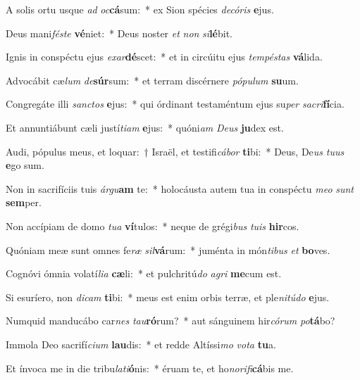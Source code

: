 \item A solis ortu usque \textit{ad} \textit{oc}\textbf{cá}sum:~* ex Sion spécies \textit{de}\textit{có}\textit{ris} \textbf{e}jus.
\item Deus mani\textit{fés}\textit{te} \textbf{vé}niet:~* Deus noster \textit{et} \textit{non} \textit{si}\textbf{lé}bit.
\item Ignis in conspéctu ejus \textit{ex}\textit{ar}\textbf{dé}scet:~* et in circúitu ejus \textit{tem}\textit{pés}\textit{tas} \textbf{vá}lida.
\item Advocábit cæ\textit{lum} \textit{de}\textbf{súr}sum:~* et terram discérnere \textit{pó}\textit{pu}\textit{lum} \textbf{su}um.
\item Congregáte illi \textit{sanc}\textit{tos} \textbf{e}jus:~* qui órdinant testaméntum ejus su\textit{per} \textit{sa}\textit{cri}\textbf{fí}cia.
\item Et annuntiábunt cæli justí\textit{ti}\textit{am} \textbf{e}jus:~* quóni\textit{am} \textit{De}\textit{us} \textbf{ju}dex est.
\item Audi, pópulus meus, et loquar:~† Israël, et testifi\textit{cá}\textit{bor} \textbf{ti}bi:~* Deus, De\textit{us} \textit{tu}\textit{us} \textbf{e}go sum.
\item Non in sacrifíciis tuis \textit{ár}\textit{gu}\textbf{am} te:~* holocáusta autem tua in conspéctu \textit{me}\textit{o} \textit{sunt} \textbf{sem}per.
\item Non accípiam de domo \textit{tu}\textit{a} \textbf{ví}tulos:~* neque de grégi\textit{bus} \textit{tu}\textit{is} \textbf{hir}cos.
\item Quóniam meæ sunt omnes fe\textit{ræ} \textit{sil}\textbf{vá}rum:~* juménta in món\textit{ti}\textit{bus} \textit{et} \textbf{bo}ves.
\item Cognóvi ómnia volatí\textit{li}\textit{a} \textbf{cæ}li:~* et pulchritú\textit{do} \textit{a}\textit{gri} \textbf{me}cum est.
\item Si esuríero, non \textit{di}\textit{cam} \textbf{ti}bi:~* meus est enim orbis terræ, et ple\textit{ni}\textit{tú}\textit{do} \textbf{e}jus.
\item Numquid manducábo car\textit{nes} \textit{tau}\textbf{ró}rum?~* aut sánguinem hir\textit{có}\textit{rum} \textit{po}\textbf{tá}bo?
\item Immola Deo sacrifí\textit{ci}\textit{um} \textbf{lau}dis:~* et redde Altíssi\textit{mo} \textit{vo}\textit{ta} \textbf{tu}a.
\item Et ínvoca me in die tribu\textit{la}\textit{ti}\textbf{ó}nis:~* éruam te, et ho\textit{no}\textit{ri}\textit{fi}\textbf{cá}bis me.
